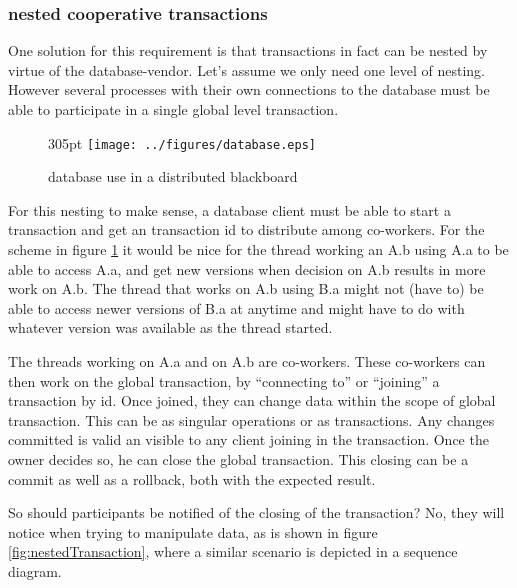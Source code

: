 \documentclass[]{lofar}
\begin{document}
      \subsubsection{nested cooperative transactions}
      \label{subsubsec:nested-cooperative-transaction}\hypertarget{subsubsec:nested-cooperative-transaction}{}

        One solution for this requirement is that transactions in fact
        can be nested by virtue of the database-vendor. Let's assume
        we only need one level of nesting. However several processes
        with their own connections to the database must be able to
        participate in a single global level transaction.

        \begin{figure}{305pt}
          \texttt{[image: ../figures/database.eps]}
          \hypertarget{fig:database}{}
          \caption{database use in a distributed blackboard\label{fig:database}}
        \end{figure}

        For this nesting to make sense, a database client must be able
        to start a transaction and get an transaction id to distribute
        among co-workers. For the scheme in figure
        \hyperlink{fig:database}{\ref{fig:database}} it would be nice
        for the thread working an A.b using A.a to be able to access
        A.a, and get new versions when decision on A.b results in more
        work on A.b. The thread that works on A.b using B.a might not
        (have to) be able to access newer versions of B.a at anytime
        and might have to do with whatever version was available as
        the thread started.

        The threads working on A.a and on A.b are co-workers. These
        co-workers can then work on the global transaction, by
        ``connecting to'' or ``joining'' a transaction by id. Once
        joined, they can change data within the scope of global
        transaction. This can be as singular operations or as
        transactions. Any changes committed is valid an visible to any
        client joining in the transaction. Once the owner decides so,
        he can close the global transaction. This closing can be a
        commit as well as a rollback, both with the expected result.

        So should participants be notified of the closing of the
        transaction?  No, they will notice when trying to manipulate
        data, as is shown in figure
        \hyperlink{fig:nestedTransaction}{\ref{fig:nestedTransaction}},
        where a similar scenario is depicted in a sequence diagram.
\end{document}
